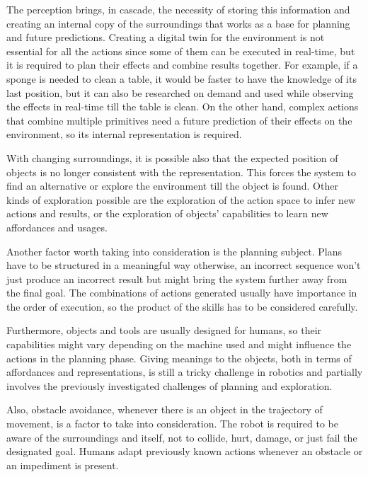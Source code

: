 The perception brings, in cascade, the necessity of storing this information and creating an internal copy of the surroundings that works as a base for planning and future predictions. Creating a digital twin for the environment is not essential for all the actions since some of them can be executed in real-time, but it is required to plan their effects and combine results together. For example, if a sponge is needed to clean a table, it would be faster to have the knowledge of its last position, but it can also be researched on demand and used while observing the effects in real-time till the table is clean. On the other hand, complex actions that combine multiple primitives need a future prediction of their effects on the environment, so its internal representation is required. 

With changing surroundings, it is possible also that the expected position of objects is no longer consistent with the representation. This forces the system to find an alternative or explore the environment till the object is found. Other kinds of exploration possible are the exploration of the action space to infer new actions and results, or the exploration of objects' capabilities to learn new affordances and usages. \cite{Ahmetoglu_2022} 

Another factor worth taking into consideration is the planning subject. Plans have to be structured in a meaningful way otherwise, an incorrect sequence won't just produce an incorrect result but might bring the system further away from the final goal. The combinations of actions generated usually have importance in the order of execution, so the product of the skills has to be considered carefully. 

Furthermore, objects and tools are usually designed for humans, so their capabilities might vary depending on the machine used and might influence the actions in the planning phase. Giving meanings to the objects, both in terms of affordances and representations, is still a tricky challenge in robotics \cite{7523298} and partially involves the previously investigated challenges of planning and exploration. 

Also, obstacle avoidance, whenever there is an object in the trajectory of movement, is a factor to take into consideration. The robot is required to be aware of the surroundings and itself, not to collide, hurt, damage, or just fail the designated goal. Humans adapt previously known actions whenever an obstacle or an impediment is present. 

